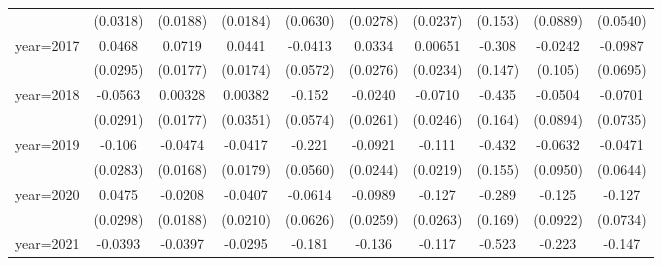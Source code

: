 \begin{table}[htbp]
\begin{tabular}{l*{9}{c}}
                    &    (0.0318)         &    (0.0188)         &    (0.0184)         &    (0.0630)         &    (0.0278)         &    (0.0237)         &     (0.153)         &    (0.0889)         &    (0.0540)         \\
[1em]
year=2017           &      0.0468         &      0.0719\sym{***}&      0.0441\sym{**} &     -0.0413         &      0.0334         &     0.00651         &      -0.308\sym{**} &     -0.0242         &     -0.0987         \\
                    &    (0.0295)         &    (0.0177)         &    (0.0174)         &    (0.0572)         &    (0.0276)         &    (0.0234)         &     (0.147)         &     (0.105)         &    (0.0695)         \\
[1em]
year=2018           &     -0.0563\sym{*}  &     0.00328         &     0.00382         &      -0.152\sym{***}&     -0.0240         &     -0.0710\sym{***}&      -0.435\sym{***}&     -0.0504         &     -0.0701         \\
                    &    (0.0291)         &    (0.0177)         &    (0.0351)         &    (0.0574)         &    (0.0261)         &    (0.0246)         &     (0.164)         &    (0.0894)         &    (0.0735)         \\
[1em]
year=2019           &      -0.106\sym{***}&     -0.0474\sym{***}&     -0.0417\sym{**} &      -0.221\sym{***}&     -0.0921\sym{***}&      -0.111\sym{***}&      -0.432\sym{***}&     -0.0632         &     -0.0471         \\
                    &    (0.0283)         &    (0.0168)         &    (0.0179)         &    (0.0560)         &    (0.0244)         &    (0.0219)         &     (0.155)         &    (0.0950)         &    (0.0644)         \\
[1em]
year=2020           &      0.0475         &     -0.0208         &     -0.0407\sym{*}  &     -0.0614         &     -0.0989\sym{***}&      -0.127\sym{***}&      -0.289\sym{*}  &      -0.125         &      -0.127\sym{*}  \\
                    &    (0.0298)         &    (0.0188)         &    (0.0210)         &    (0.0626)         &    (0.0259)         &    (0.0263)         &     (0.169)         &    (0.0922)         &    (0.0734)         \\
[1em]
year=2021           &     -0.0393         &     -0.0397\sym{**} &     -0.0295         &      -0.181\sym{***}&      -0.136\sym{***}&      -0.117\sym{***}&      -0.523\sym{***}&      -0.223\sym{*}  &      -0.147         \\

\end{tabular}
\end{table}
